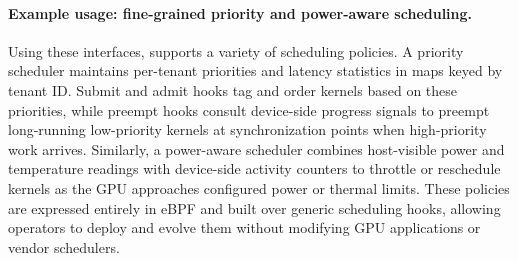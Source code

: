 \paragraph{Example usage: fine-grained priority and power-aware scheduling.}
Using these interfaces, \sys supports a variety of scheduling policies. A priority
scheduler maintains per-tenant priorities and latency statistics in maps keyed by
tenant ID. Submit and admit hooks tag and order kernels based on these priorities,
while preempt hooks consult device-side progress signals to preempt long-running
low-priority kernels at synchronization points when high-priority work arrives.
Similarly, a power-aware scheduler combines host-visible power and temperature
readings with device-side activity counters to throttle or reschedule kernels as
the GPU approaches configured power or thermal limits. These policies are expressed
entirely in eBPF and built over generic scheduling hooks, allowing operators to
deploy and evolve them without modifying GPU applications or vendor schedulers.
